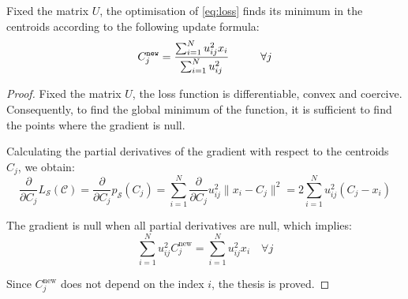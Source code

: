 \bigskip
\begin{theorem}
	\label{thm:Mupdate}
    Fixed the matrix $U$, the optimisation of \cref{eq:loss} finds its minimum in the centroids according to the following update formula:
    \begin{equation}
        C^{\texttt{new}}_j = \frac{\sum_{i=1}^Nu_{ij}^2x_{i}}{\sum_{i=1}^Nu_{ij}^2} \text{\hspace{1cm}} \forall j
    \end{equation}
	\begin{proof}
	    Fixed the matrix $U$, the loss function is differentiable, convex and coercive. Consequently, to find the global minimum of the function, it is sufficient to find the points where the gradient is null.

	    \noindent Calculating the partial derivatives of the gradient with respect to the centroids $C_j$, we obtain:
	\begin{equation*}
	    \frac{\partial}{\partial C_{j}} L_\mathcal{S}(\mathcal{C}) = \frac{\partial}{\partial C_{j}} p_\mathcal{S}(C_j) = \sum_{i=1}^N\frac{\partial}{\partial C_{j}} u_{ij}^2\|x_i-C_j\|^2 = 2\sum_{i=1}^N u_{ij}^2\left(C_{j}-x_{i}\right)
	\end{equation*}

	\noindent The gradient is null when all partial derivatives are null, which implies:
	\begin{equation*}
	    \sum_{i=1}^N u_{ij}^2C^{\text{new}}_{j} = \sum_{i=1}^N u_{ij}^2x_{i} \quad \forall j
	\end{equation*}

	\noindent Since $C^{\text{new}}_j$ does not depend on the index $i$, the thesis is proved.
	\end{proof}
\end{theorem}

